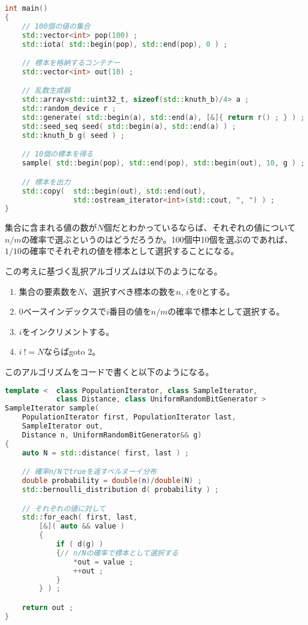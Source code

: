 \begin{lstlisting}[language=C++]
int main()
{
    // 100個の値の集合
    std::vector<int> pop(100) ;
    std::iota( std::begin(pop), std::end(pop), 0 ) ;

    // 標本を格納するコンテナー
    std::vector<int> out(10) ;

    // 乱数生成器
    std::array<std::uint32_t, sizeof(std::knuth_b)/4> a ;
    std::random_device r ;
    std::generate( std::begin(a), std::end(a), [&]{ return r() ; } ) ;
    std::seed_seq seed( std::begin(a), std::end(a) ) ;
    std::knuth_b g( seed ) ;

    // 10個の標本を得る
    sample( std::begin(pop), std::end(pop), std::begin(out), 10, g ) ;

    // 標本を出力
    std::copy(  std::begin(out), std::end(out),
                std::ostream_iterator<int>(std::cout, ", ") ) ;
}
\end{lstlisting}

集合に含まれる値の数が\(N\)個だとわかっているならば、それぞれの値について\(n/m\)の確率で選ぶというのはどうだろうか。100個中10個を選ぶのであれば、\(1/10\)の確率でそれぞれの値を標本として選択することになる。

この考えに基づく乱択アルゴリズムは以下のようになる。

\begin{enumerate}
\def\labelenumi{\arabic{enumi}.}
\itemsep1pt\parskip0pt
\item
  集合の要素数を\(N\)、選択すべき標本の数を\(n\), \(i\)を0とする。
\item
  0ベースインデックスで\(i\)番目の値を\(n/m\)の確率で標本として選択する。
\item
  \(i\)をインクリメントする。
\item
  \(i\ != N\)ならばgoto 2。
\end{enumerate}

このアルゴリズムをコードで書くと以下のようになる。

\begin{lstlisting}[language=C++]
template <  class PopulationIterator, class SampleIterator,
            class Distance, class UniformRandomBitGenerator >
SampleIterator sample(
    PopulationIterator first, PopulationIterator last,
    SampleIterator out,
    Distance n, UniformRandomBitGenerator&& g)
{
    auto N = std::distance( first, last ) ;

    // 確率n/Nでtrueを返すベルヌーイ分布
    double probability = double(n)/double(N) ;
    std::bernoulli_distribution d( probability ) ;

    // それぞれの値に対して
    std::for_each( first, last,
        [&]( auto && value )
        {
            if ( d(g) )
            {// n/Nの確率で標本として選択する
                *out = value ;
                ++out ;
            }
        } ) ;

    return out ;
}
\end{lstlisting}

